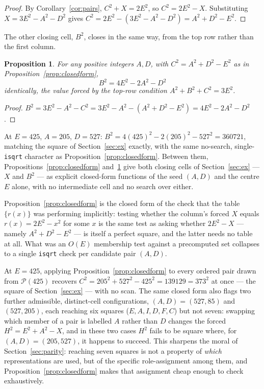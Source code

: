 \documentclass[12pt]{article}
\newtheorem{proposition}[theorem]{Proposition}
\theoremstyle{remark}
\begin{document}
\begin{proof}
By Corollary~\ref{cor:pairs}, $C^2+X=2E^2$, so $C^2=2E^2-X$.
Substituting $X=3E^2-A^2-D^2$ gives
$C^2 = 2E^2-(3E^2-A^2-D^2) = A^2+D^2-E^2$.
\end{proof}

The other closing cell, $B^2$, closes in the same way, from the top
row rather than the first column.

\begin{proposition}\label{prop:closedformB}
For any positive integers $A,D$, with $C^2=A^2+D^2-E^2$ as in
Proposition~\ref{prop:closedform},
\[
B^2 = 4E^2 - 2A^2 - D^2
\]
identically, the value forced by the top-row condition
$A^2+B^2+C^2=3E^2$.
\end{proposition}

\begin{proof}
$B^2 = 3E^2-A^2-C^2 = 3E^2-A^2-(A^2+D^2-E^2) = 4E^2-2A^2-D^2$.
\end{proof}

At $E=425$, $A=205$, $D=527$: $B^2=4(425)^2-2(205)^2-527^2=360721$,
matching the square of Section~\ref{sec:ex} exactly, with the same
no-search, single-\texttt{isqrt} character as Proposition~\ref{prop:closedform}.
Between them, Propositions~\ref{prop:closedform}
and~\ref{prop:closedformB} give both closing cells of
Section~\ref{sec:ex} --- $X$ and $B^2$ --- as explicit closed-form
functions of the seed $(A,D)$ and the centre $E$ alone, with no
intermediate cell and no search over either.

Proposition~\ref{prop:closedform} is the closed form of the check that
the table $\{r(x)\}$ was performing implicitly: testing whether the
column's forced $X$ equals $r(x)=2E^2-x^2$ for some $x$ is the same
test as asking whether $2E^2-X$ --- namely $A^2+D^2-E^2$ --- is itself
a perfect square, and the latter needs no table at all. What was an
$O(E)$ membership test against a precomputed set collapses to a single
\texttt{isqrt} check per candidate pair $(A,D)$.

At $E=425$, applying Proposition~\ref{prop:closedform} to every ordered
pair drawn from $\mathcal P(425)$ recovers $C^2=205^2+527^2-425^2=
139129=373^2$ at once --- the square of Section~\ref{sec:ex} --- with
no scan. The same closed form also flags two further admissible,
distinct-cell configurations, $(A,D)=(527,85)$ and $(527,205)$, each
reaching six squares ($E,A,I,D,F,C$) but not seven: swapping which
member of a pair is labelled $A$ rather than $D$ changes the forced
$H^2=E^2+A^2-X$, and in these two cases $H^2$ fails to be square where,
for $(A,D)=(205,527)$, it happens to succeed. This sharpens the moral
of Section~\ref{sec:parity}: reaching seven squares is not a property
of \emph{which} representations are used, but of the specific
role-assignment among them, and Proposition~\ref{prop:closedform} makes
that assignment cheap enough to check exhaustively.
\end{document}
